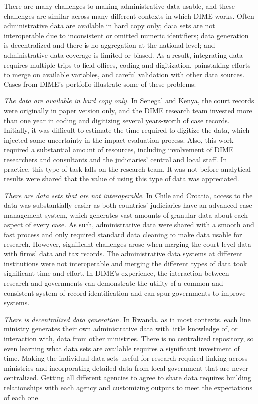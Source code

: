 There are many challenges to making administrative data usable, and these challenges are similar across many different contexts in which DIME works. Often administrative data are available in hard copy only; data sets are not interoperable due to inconsistent or omitted numeric identifiers; data generation is decentralized and there is no aggregation at the national level; and administrative data coverage is limited or biased. As a result, integrating data requires multiple trips to field offices, coding and digitization, painstaking efforts to merge on available variables, and careful validation with other data sources. Cases from DIME's portfolio illustrate some of these problems:

\emph{The data are available in hard copy only.} In Senegal and Kenya, the court records were originally in paper version only, and the DIME research team invested more than one year in coding and digitizing several years-worth of case records. Initially, it was difficult to estimate the time required to digitize the data, which injected some uncertainty in the impact evaluation process. Also, this work required a substantial amount of resources, including involvement of DIME researchers and consultants and the judiciaries' central and local staff. In practice, this type of task falls on the research team. It was not before analytical results were shared that the value of using this type of data was appreciated.

\emph{There are data sets that are not interoperable}. In Chile and Croatia, access to the data was substantially easier as both countries' judiciaries have an advanced case management system, which generates vast amounts of granular data about each aspect of every case. As such, administrative data were shared with a smooth and fast process and only required standard data cleaning to make data usable for research. However, significant challenges arose when merging the court level data with firms' data and tax records. The administrative data systems at different institutions were not interoperable and merging the different types of data took significant time and effort. In DIME's experience, the interaction between research and governments can demonstrate the utility of a common and consistent system of record identification and can spur governments to improve systems.

\emph{There is decentralized data generation.} In Rwanda, as in most contexts, each line ministry generates their own administrative data with little knowledge of, or interaction with, data from other ministries. There is no centralized repository, so even learning what data sets are available requires a significant investment of time. Making the individual data sets useful for research required linking across ministries and incorporating detailed data from local government that are never centralized. Getting all different agencies to agree to share data requires building relationships with each agency and customizing outputs to meet the expectations of each one.

